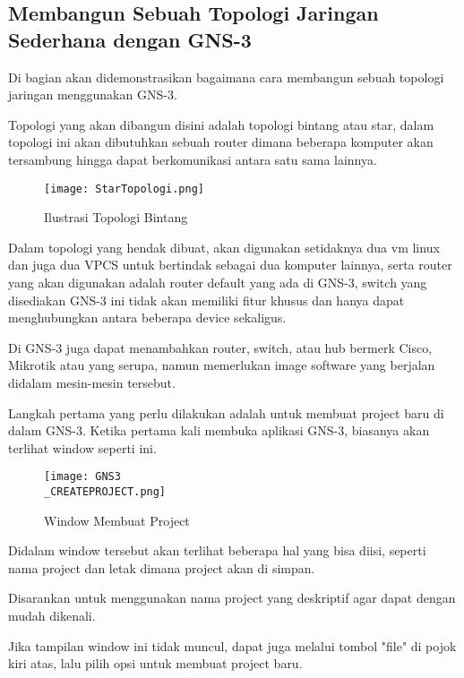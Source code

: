 \documentclass[12pt, a4paper]{article}
\begin{document}
    \newpage
    \subsection{Membangun Sebuah Topologi Jaringan Sederhana dengan GNS-3}

      Di bagian akan didemonstrasikan bagaimana cara membangun sebuah topologi
      jaringan menggunakan GNS-3.

      Topologi yang akan dibangun disini adalah topologi bintang atau star,
      dalam topologi ini akan dibutuhkan sebuah router dimana beberapa komputer
      akan tersambung hingga dapat berkomunikasi antara satu sama lainnya.

      \begin{figure}[h]
          \centering
          \texttt{[image: StarTopologi.png]}
          \caption{\small{Ilustrasi Topologi Bintang }}
      \end{figure}

      Dalam topologi yang hendak dibuat, akan digunakan setidaknya dua vm linux
      dan juga dua  VPCS untuk bertindak sebagai dua komputer lainnya, serta router yang akan
      digunakan adalah router default yang ada di GNS-3, switch yang disediakan
      GNS-3 ini tidak akan memiliki fitur khusus dan hanya dapat menghubungkan
      antara beberapa device sekaligus.

      Di GNS-3 juga dapat menambahkan router, switch, atau hub bermerk Cisco,
      Mikrotik atau yang serupa, namun memerlukan image software yang berjalan
      didalam mesin-mesin tersebut.

      \newpage 
      Langkah pertama yang perlu dilakukan adalah untuk membuat project baru di
      dalam GNS-3. Ketika pertama kali membuka aplikasi GNS-3, biasanya akan
      terlihat window seperti ini.

      \begin{figure}[h]
          \centering
          \texttt{[image: GNS3\\\_CREATEPROJECT.png]}
          \caption{\small{Window Membuat Project}}
      \end{figure}

      Didalam window tersebut akan terlihat beberapa hal yang bisa diisi, seperti
      nama project dan letak dimana project akan di simpan.

      Disarankan untuk menggunakan nama project yang deskriptif agar dapat
      dengan mudah dikenali.

      Jika tampilan window ini tidak muncul, dapat juga melalui tombol "file"
      di pojok kiri atas, lalu pilih opsi untuk membuat project baru.
\end{document}
